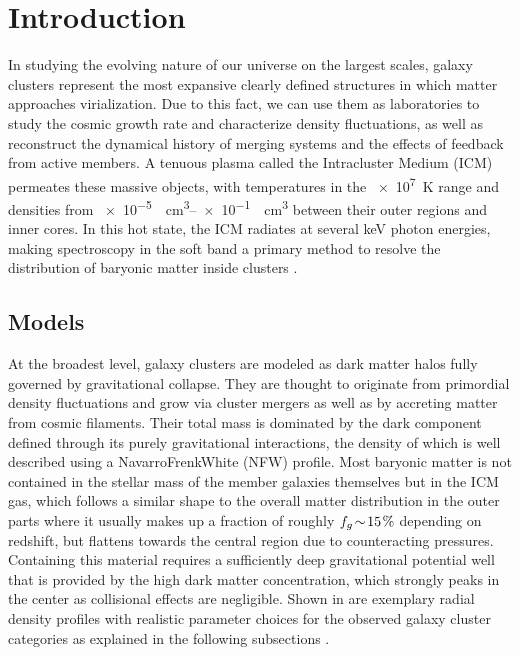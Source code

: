 \section{Introduction}
\label{sec:introduction}

In studying the evolving nature of our universe on the largest scales, galaxy clusters represent
the most expansive clearly defined structures in which matter approaches virialization. Due to
this fact, we can use them as laboratories to study the cosmic growth rate and characterize
density fluctuations, as well as reconstruct the dynamical history of merging systems and the
effects of feedback from active members. A tenuous plasma called the Intracluster Medium (ICM)
permeates these massive objects, with temperatures in the \qty{e7}{\kelvin} range and densities
from \qtyrange{e-5}{e-1}{\per\centi\meter\cubed} between their outer regions and inner cores.
In this hot state, the ICM radiates at several \unit{\kilo\electronvolt} photon energies,
making spectroscopy in the soft \xray band a primary method to resolve the distribution of baryonic
matter inside clusters \cite{sara1986}. 


\subsection{Models}

At the broadest level, galaxy clusters are modeled as dark matter halos fully governed by gravitational
collapse. They are thought to originate from primordial density fluctuations and grow via cluster mergers
as well as by accreting matter from cosmic filaments. Their total mass is dominated by the dark component
defined through its purely gravitational interactions, the density of which is well described using a
Navarro{\hspace{0.09em}\dash\hspace{0.04em}}Frenk{\dash}White (NFW) profile. Most baryonic matter is
not contained in the stellar mass of the member galaxies themselves but in the ICM gas, which follows
a similar shape to the overall matter distribution in the outer parts where it usually makes up a fraction
of roughly $f_g \!\sim\! 15\kern1pt\%$ depending on redshift, but flattens towards the central region due
to counteracting pressures. Containing this material requires a sufficiently deep gravitational potential
well that is provided by the high dark matter concentration, which strongly peaks in the center as
collisional effects are negligible. Shown in  are exemplary radial density profiles 
with realistic parameter choices for the observed galaxy cluster categories as explained in the
following subsections \cite{prat2019}.

